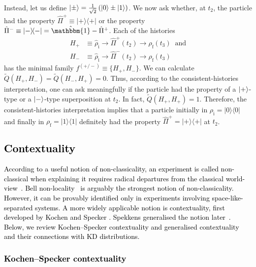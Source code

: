 \documentclass[%
 reprint,
superscriptaddress,
nofootinbib,
bibnotes,
 amsmath,amssymb,
 aps,
]{revtex4-1}
\theoremstyle{plain}
\newcommand*{\ketbra}[2]{\lvert #1 \rangle\!\langle #2 \rvert}
\newcommand{\Dave}[1]{\textcolor{black}{#1} }
\newcommand{\nicole}[1]{\textcolor{black}{#1} }
\begin{document}
Instead, let us define 
$\ket{\pm}=\frac{1}{\sqrt{2}} \left( \ket{0} \pm \ket{1} \right)$.
We now ask whether, at $t_2$, the particle had the property $\hat{\Pi}^+ \equiv \ketbra{+}{+}$  or the property $\hat{\Pi}^- \equiv  \ketbra{-}{-} = \hat{\mathbbm{1}} - \hat{\Pi}^+$.
Each of the histories
\begin{align}
H_+ &
\equiv
\hat{\rho}_{\mathrm{i}} \rightarrow  \hat{\Pi}^+ (t_2)  \rightarrow \hat{\rho}_{\mathrm{f}} (t_3)  \; \; \mathrm{and} \\
H_- &
\equiv
\hat{\rho}_{\mathrm{i}} \rightarrow  \hat{\Pi}^- (t_2)  \rightarrow \hat{\rho}_{\mathrm{f}} (t_3) 
\end{align}
has the minimal family $f^{(+/-)} \equiv \{ H_+, H_-\}$.
We can calculate $\tilde{Q}(H_+,H_-)=\tilde{Q}(H_-,H_+)=0$. Thus, according to the consistent-histories interpretation, one can ask meaningfully if the particle had the property of a $\ket{+}$-type or a $\ket{-}$-type superposition at $t_2$.  In fact, $\tilde{Q}(H_+,H_+)=1$. Therefore, the consistent-histories interpretation 
implies that a particle initially in $\rho_{\mathrm{i}} = \ketbra{0}{0}$ and finally in $\rho_{\mathrm{f}} = \ketbra{1}{1}$ definitely had the property $\hat{\Pi}^+ = \ketbra{+}{+}$ at $t_2$. 

\subsection{\Dave{Contextuality}}
\label{SubSec:Context}


\nicole{
According to a useful notion of non-classicality, an experiment is 
called non-classical when explaining it requires
radical departures from the classical world-view~\cite{jennings2016no}.  
Bell non-locality~\cite{brunner2014bell} is arguably the strongest notion of non-classicality. However, it can be provably identified only in experiments involving space-like-separated systems.  A more widely applicable notion is contextuality, first developed by Kochen and Specker \cite{Specker60, Kochen68, Budroni22}. Spekkens generalised the notion later~\cite{Quanta22,spekkens2005contextuality}.  Below, we review  Kochen--Specker contextuality and generalised contextuality
and their connections with KD distributions. 
}


\subsubsection{\Dave{Kochen--Specker contextuality}}
\label{SubSec:KSContext}
\end{document}
